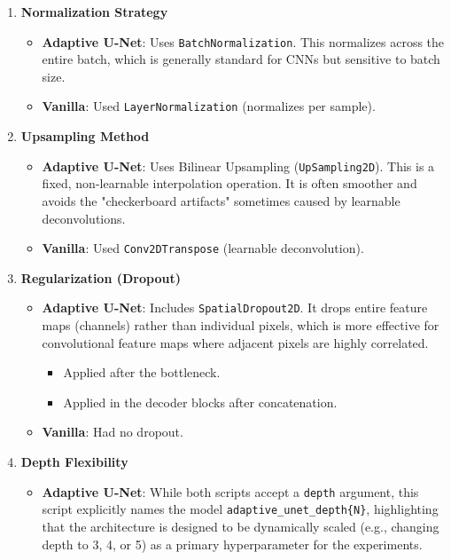 \begin{enumerate}
    \item \textbf{Normalization Strategy}
    \begin{itemize}
        \item \textbf{Adaptive U-Net}: Uses \texttt{BatchNormalization}. This normalizes across the entire batch, which is generally standard for CNNs but sensitive to batch size.
        \item \textbf{Vanilla}: Used \texttt{LayerNormalization} (normalizes per sample).
    \end{itemize}

    \item \textbf{Upsampling Method}
    \begin{itemize}
        \item \textbf{Adaptive U-Net}: Uses Bilinear Upsampling (\texttt{UpSampling2D}). This is a fixed, non-learnable interpolation operation. It is often smoother and avoids the "checkerboard artifacts" sometimes caused by learnable deconvolutions.
        \item \textbf{Vanilla}: Used \texttt{Conv2DTranspose} (learnable deconvolution).
    \end{itemize}

    \item \textbf{Regularization (Dropout)}
    \begin{itemize}
        \item \textbf{Adaptive U-Net}: Includes \texttt{SpatialDropout2D}. It drops entire feature maps (channels) rather than individual pixels, which is more effective for convolutional feature maps where adjacent pixels are highly correlated.
        \begin{itemize}
            \item Applied after the bottleneck.
            \item Applied in the decoder blocks after concatenation.
        \end{itemize}
        \item \textbf{Vanilla}: Had no dropout.
    \end{itemize}

    \item \textbf{Depth Flexibility}
    \begin{itemize}
        \item \textbf{Adaptive U-Net}: While both scripts accept a \texttt{depth} argument, this script explicitly names the model \texttt{adaptive\_unet\_depth\{N\}}, highlighting that the architecture is designed to be dynamically scaled (e.g., changing depth to 3, 4, or 5) as a primary hyperparameter for the experiments.
    \end{itemize}
\end{enumerate}


